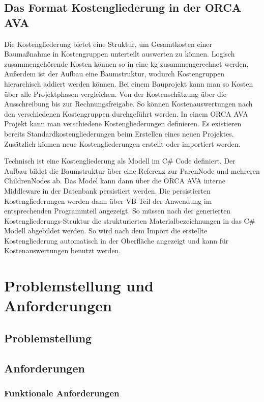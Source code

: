 \subsection{Das Format Kostengliederung in der ORCA AVA}
\label{s:basics:coststructure}
Die Kostengliederung bietet eine Struktur, um Gesamtkosten einer Baumaßnahme in Kostengruppen unterteilt auswerten zu können. Logisch zusammengehörende Kosten können so in eine \ac{kg} zusammengerechnet werden. Außerdem ist der Aufbau eine Baumstruktur, wodurch Kostengruppen hierarchisch addiert werden können. 
Bei einem Bauprojekt kann man so Kosten über alle Projektphasen vergleichen. Von der Kostenschätzung über die  Ausschreibung bis zur Rechnungsfreigabe. So können Kostenauswertungen nach den verschiedenen Kostengruppen durchgeführt werden. In einem ORCA AVA Projekt kann man verschiedene Kostengliederungen definieren. Es existieren bereits Standardkostengliederungen beim Erstellen eines neuen Projektes. Zusätzlich können neue Kostengliederungen erstellt oder importiert werden.\citep{noauthor_undated-bx}

Technisch ist eine Kostengliederung als Modell im C\# Code definiert. Der Aufbau bildet die Baumstruktur über eine Referenz zur ParenNode und mehreren ChildrenNodes ab. Das Model kann dann über die ORCA AVA interne Middleware in der Datenbank persistiert werden. Die persistierten Kostengliederungen werden dann über VB-Teil der Anwendung im entsprechenden Programmteil angezeigt.
So müssen nach der generierten Kostengliederungs-Struktur die strukturierten Materialbezeichnungen in das C\# Modell abgebildet werden. So wird nach dem Import die erstellte Kostengliederung automatisch in der Oberfläche angezeigt und kann für Kostenauswertungen benutzt werden.

\section{Problemstellung und Anforderungen}
\label{s:requirements}
\subsection{Problemstellung}
\label{s:requirements:problem}
\subsection{Anforderungen}
\label{s:requirements:requirements}
\subsubsection{Funktionale Anforderungen}
\label{s:requirements:requirements:functional}

